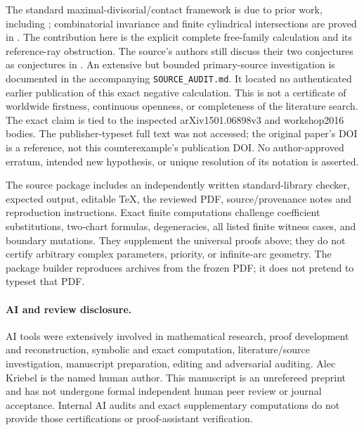 \documentclass[11pt]{article}
\begin{document}
The standard maximal-divisorial/contact framework is due to prior work,
including \cite{ishii}; combinatorial invariance and finite cylindrical
intersections are proved in \cite{original}. The contribution here is
the explicit complete free-family calculation and its reference-ray
obstruction. The source's authors still discuss their two conjectures
as conjectures in \cite[Section~8]{survey}. An extensive but bounded
primary-source investigation is documented in the accompanying
\texttt{SOURCE\_AUDIT.md}. It located no authenticated earlier
publication of this exact negative calculation. This is not a certificate
of worldwide firstness, continuous openness, or completeness of the
literature search. The exact claim is tied to the inspected
arXiv1501.06898v3 and workshop2016 bodies. The publisher-typeset full text
was not accessed; the original paper's DOI is a reference, not this
counterexample's publication DOI. No author-approved erratum, intended
new hypothesis, or unique resolution of its notation is asserted.

The source package includes an independently written standard-library
checker, expected output, editable TeX, the reviewed PDF, source/provenance
notes and reproduction instructions. Exact finite computations challenge
coefficient substitutions, two-chart formulas, degeneracies, all listed
finite witness cases, and boundary mutations. They supplement the
universal proofs above; they do not certify arbitrary complex parameters,
priority, or infinite-arc geometry. The package builder reproduces
archives from the frozen PDF; it does not pretend to typeset that PDF.

\paragraph{AI and review disclosure.}
AI tools were extensively involved in mathematical research, proof
development and reconstruction, symbolic and exact computation,
literature/source investigation, manuscript preparation, editing and
adversarial auditing. Alec Kriebel is the named human author.
This manuscript is an unrefereed preprint and has not undergone formal
independent human peer review or journal acceptance. Internal AI audits
and exact supplementary computations do not provide those certifications
or proof-assistant verification.
\end{document}
